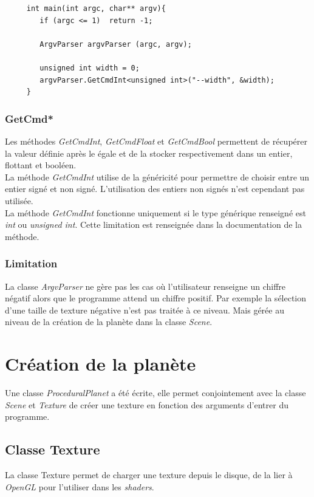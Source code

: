   \lstset{language=C++}
  \begin{lstlisting}
     int main(int argc, char** argv){
        if (argc <= 1)  return -1;
        
        ArgvParser argvParser (argc, argv);
        
        unsigned int width = 0;
        argvParser.GetCmdInt<unsigned int>("--width", &width);
     }
  \end{lstlisting}
  
   \subsubsection{GetCmd*}
    Les méthodes \textit{GetCmdInt}, \textit{GetCmdFloat} et \textit{GetCmdBool} permettent de récupérer la valeur définie après le égale et de la stocker respectivement dans un entier, flottant et booléen.\\
    
    La méthode \textit{GetCmdInt} utilise de la généricité pour permettre de choisir entre un entier signé et non signé. L'utilisation des entiers non signés n'est cependant pas utilisée.\\
    
    La méthode \textit{GetCmdInt} fonctionne uniquement si le type générique renseigné est \textit{int} ou \textit{unsigned int}. Cette limitation est renseignée dans la documentation de la méthode.
    
  \subsubsection{Limitation}
    
    La classe \textit{ArgvParser} ne gère pas les cas où l'utilisateur renseigne un chiffre négatif alors que le programme attend un chiffre positif. Par exemple la sélection d'une taille de texture négative
    n'est pas traitée à ce niveau. Mais gérée au niveau de la création de la planète dans la classe \textit{Scene}.
  
  \section{Création de la planète}
  Une classe \textit{ProceduralPlanet} a été écrite, elle permet conjointement avec la classe \textit{Scene} et \textit{Texture} de créer une texture en fonction des arguments d'entrer du programme.
  
  \subsection{Classe Texture}
  \label{sec:class_texture}
  La classe Texture permet de charger une texture depuis le disque, de la lier à \textit{OpenGL} pour l'utiliser dans les \textit{shaders}.\\
  
